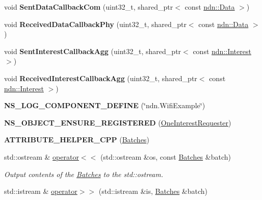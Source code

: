 \begin{DoxyCompactItemize}
\item 
void {\bfseries Sent\+Data\+Callback\+Com} (uint32\+\_\+t, shared\+\_\+ptr$<$ const \hyperlink{classndn_1_1Data}{ndn\+::\+Data} $>$)\hypertarget{namespacens3_af3dedcbad1672d86d6a9bb701d12f726}{}\label{namespacens3_af3dedcbad1672d86d6a9bb701d12f726}

\item 
void {\bfseries Received\+Data\+Callback\+Phy} (uint32\+\_\+t, shared\+\_\+ptr$<$ const \hyperlink{classndn_1_1Data}{ndn\+::\+Data} $>$)\hypertarget{namespacens3_add66ff205f726a699e2e3d41f5436e75}{}\label{namespacens3_add66ff205f726a699e2e3d41f5436e75}

\item 
void {\bfseries Sent\+Interest\+Callback\+Agg} (uint32\+\_\+t, shared\+\_\+ptr$<$ const \hyperlink{classndn_1_1Interest}{ndn\+::\+Interest} $>$)\hypertarget{namespacens3_ab3606bac05583adb9012c2c94399c1b7}{}\label{namespacens3_ab3606bac05583adb9012c2c94399c1b7}

\item 
void {\bfseries Received\+Interest\+Callback\+Agg} (uint32\+\_\+t, shared\+\_\+ptr$<$ const \hyperlink{classndn_1_1Interest}{ndn\+::\+Interest} $>$)\hypertarget{namespacens3_ad79b3e89de009a475d0ab9f5cfad2ed9}{}\label{namespacens3_ad79b3e89de009a475d0ab9f5cfad2ed9}

\item 
{\bfseries N\+S\+\_\+\+L\+O\+G\+\_\+\+C\+O\+M\+P\+O\+N\+E\+N\+T\+\_\+\+D\+E\+F\+I\+NE} (\char`\"{}ndn.\+Wifi\+Example\char`\"{})\hypertarget{namespacens3_a30242db4b05f90dc3a20fa09f0af5658}{}\label{namespacens3_a30242db4b05f90dc3a20fa09f0af5658}

\item 
{\bfseries N\+S\+\_\+\+O\+B\+J\+E\+C\+T\+\_\+\+E\+N\+S\+U\+R\+E\+\_\+\+R\+E\+G\+I\+S\+T\+E\+R\+ED} (\hyperlink{classns3_1_1OneInterestRequester}{One\+Interest\+Requester})\hypertarget{namespacens3_adc0de4aaacc509b4a73f8e0b93b1b8d7}{}\label{namespacens3_adc0de4aaacc509b4a73f8e0b93b1b8d7}

\item 
{\bfseries A\+T\+T\+R\+I\+B\+U\+T\+E\+\_\+\+H\+E\+L\+P\+E\+R\+\_\+\+C\+PP} (\hyperlink{classns3_1_1Batches}{Batches})\hypertarget{namespacens3_a2d7fedbd3a0894fa001804748d199ebd}{}\label{namespacens3_a2d7fedbd3a0894fa001804748d199ebd}

\item 
std\+::ostream \& \hyperlink{namespacens3_a3c923cf458e4aa84254888f2fd1552a4}{operator$<$$<$} (std\+::ostream \&os, const \hyperlink{classns3_1_1Batches}{Batches} \&batch)
\begin{DoxyCompactList}\small\item\em Output contents of the \hyperlink{classns3_1_1Batches}{Batches} to the std\+::ostream. \end{DoxyCompactList}\item 
std\+::istream \& \hyperlink{namespacens3_a84f24e359f644ec41ebe1951428d79eb}{operator$>$$>$} (std\+::istream \&is, \hyperlink{classns3_1_1Batches}{Batches} \&batch)\hypertarget{namespacens3_a84f24e359f644ec41ebe1951428d79eb}{}\label{namespacens3_a84f24e359f644ec41ebe1951428d79eb}


\end{DoxyCompactItemize}

